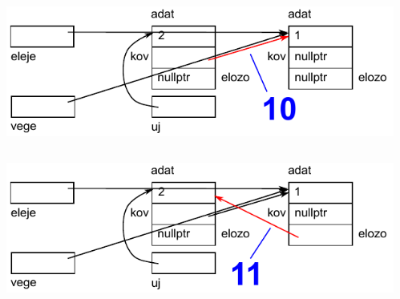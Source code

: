 \begin{frame}
  \begin{columns}[c]
      \scriptsize
      \begin{exampleblock}{}
        \vspace{-.2cm}
        
        \vspace{-.2cm}
      \end{exampleblock}
      \includegraphics[width=\textwidth]{sor/sor11.pdf}
  \end{columns}
\end{frame}

\begin{frame}
  \begin{columns}[c]
      \scriptsize
      \begin{exampleblock}{}
        \vspace{-.2cm}
        
        \vspace{-.2cm}
      \end{exampleblock}
      \includegraphics[width=\textwidth]{sor/sor12.pdf}
  \end{columns}
\end{frame}

